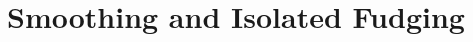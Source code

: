 \documentclass[inequalities.tex]{subfile}
\begin{document}
	\section{Smoothing and Isolated Fudging}\label{sec:smoothfudging}
	
	
\end{document}
